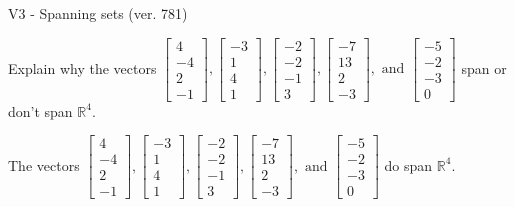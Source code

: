 \begin{exercise}
  \begin{exerciseTitle}V3 - Spanning sets (ver. 781)\end{exerciseTitle}
  \begin{exerciseStatement}
    Explain why the vectors \(\left[\begin{array}{r}
4 \\
-4 \\
2 \\
-1
\end{array}\right] , \left[\begin{array}{r}
-3 \\
1 \\
4 \\
1
\end{array}\right] , \left[\begin{array}{r}
-2 \\
-2 \\
-1 \\
3
\end{array}\right] , \left[\begin{array}{r}
-7 \\
13 \\
2 \\
-3
\end{array}\right] , \text{ and } \left[\begin{array}{r}
-5 \\
-2 \\
-3 \\
0
\end{array}\right]\) span or don't span \(\mathbb{R}^4\). 
	


  \end{exerciseStatement}
  \begin{exerciseAnswer}
   The vectors \(\left[\begin{array}{r}
4 \\
-4 \\
2 \\
-1
\end{array}\right] , \left[\begin{array}{r}
-3 \\
1 \\
4 \\
1
\end{array}\right] , \left[\begin{array}{r}
-2 \\
-2 \\
-1 \\
3
\end{array}\right] , \left[\begin{array}{r}
-7 \\
13 \\
2 \\
-3
\end{array}\right] , \text{ and } \left[\begin{array}{r}
-5 \\
-2 \\
-3 \\
0
\end{array}\right]\) 
  	 do  
	span \(\mathbb{R}^4\).
  



\end{exerciseAnswer}
\end{exercise}
